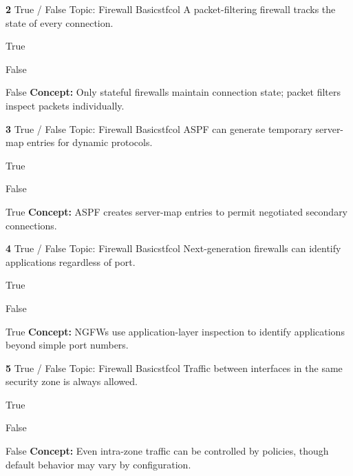 \documentclass[10pt,a4paper]{article}
\begin{document}
\begin{qcard}{\color{white}\textbf{2} \hfill \small True / False \textbar{} Topic: Firewall Basics}{tfcol}
A packet-filtering firewall tracks the state of every connection.

\begin{qoptions}
\item True
\item False
\end{qoptions}
\begin{explainbox}{False}
\textbf{Concept:} Only stateful firewalls maintain connection state; packet filters inspect packets individually.
\end{explainbox}
\end{qcard}

\begin{qcard}{\color{white}\textbf{3} \hfill \small True / False \textbar{} Topic: Firewall Basics}{tfcol}
ASPF can generate temporary server-map entries for dynamic protocols.

\begin{qoptions}
\item True
\item False
\end{qoptions}
\begin{explainbox}{True}
\textbf{Concept:} ASPF creates server-map entries to permit negotiated secondary connections.
\end{explainbox}
\end{qcard}

\begin{qcard}{\color{white}\textbf{4} \hfill \small True / False \textbar{} Topic: Firewall Basics}{tfcol}
Next-generation firewalls can identify applications regardless of port.

\begin{qoptions}
\item True
\item False
\end{qoptions}
\begin{explainbox}{True}
\textbf{Concept:} NGFWs use application-layer inspection to identify applications beyond simple port numbers.
\end{explainbox}
\end{qcard}

\begin{qcard}{\color{white}\textbf{5} \hfill \small True / False \textbar{} Topic: Firewall Basics}{tfcol}
Traffic between interfaces in the same security zone is always allowed.

\begin{qoptions}
\item True
\item False
\end{qoptions}
\begin{explainbox}{False}
\textbf{Concept:} Even intra-zone traffic can be controlled by policies, though default behavior may vary by configuration.
\end{explainbox}
\end{qcard}
\end{document}
